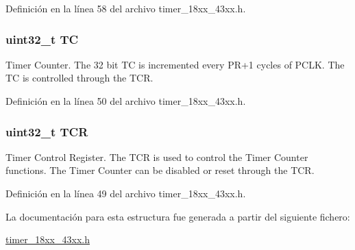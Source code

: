Definición en la línea 58 del archivo timer\+\_\+18xx\+\_\+43xx.\+h.

\subsubsection[{\texorpdfstring{TC}{TC}}]{ uint32\+\_\+t TC}\hypertarget{struct_l_p_c___t_i_m_e_r___t_abb0bc781f4dc091c913978e313c03d25}{}\label{struct_l_p_c___t_i_m_e_r___t_abb0bc781f4dc091c913978e313c03d25}
Timer Counter. The 32 bit TC is incremented every P\+R+1 cycles of P\+C\+LK. The TC is controlled through the T\+CR. 

Definición en la línea 50 del archivo timer\+\_\+18xx\+\_\+43xx.\+h.

\subsubsection[{\texorpdfstring{T\+CR}{TCR}}]{ uint32\+\_\+t T\+CR}\hypertarget{struct_l_p_c___t_i_m_e_r___t_ae9dd9282fab299d0cd6e119564688e53}{}\label{struct_l_p_c___t_i_m_e_r___t_ae9dd9282fab299d0cd6e119564688e53}
Timer Control Register. The T\+CR is used to control the Timer Counter functions. The Timer Counter can be disabled or reset through the T\+CR. 

Definición en la línea 49 del archivo timer\+\_\+18xx\+\_\+43xx.\+h.



La documentación para esta estructura fue generada a partir del siguiente fichero\+:\begin{DoxyCompactItemize}
\item 
\hyperlink{timer__18xx__43xx_8h}{timer\+\_\+18xx\+\_\+43xx.\+h}\end{DoxyCompactItemize}
